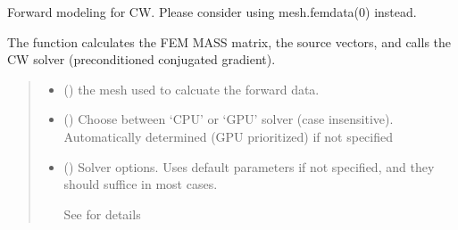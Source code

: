 \documentclass[letterpaper,10pt,english]{sphinxmanual}
\begin{document}
\begin{fulllineitems}
\label{\detokenize{_autosummary/nirfasterff.forward.femdata.femdata_stnd_CW:nirfasterff.forward.femdata.femdata_stnd_CW}}
\pysigstartsignatures
{}
\pysigstopsignatures
\sphinxAtStartPar
Forward modeling for CW. Please consider using mesh.femdata(0) instead.

\sphinxAtStartPar
The function calculates the FEM MASS matrix, the source vectors, and calls the CW solver (preconditioned conjugated gradient).
\begin{quote}\begin{description}
\begin{itemize}
\item {} 
\sphinxAtStartPar
{} () \textendash{} the mesh used to calcuate the forward data.

\item {} 
\sphinxAtStartPar
{} (\sphinxstyleliteralemphasis{\sphinxupquote{, }}) \textendash{} Choose between ‘CPU’ or ‘GPU’ solver (case insensitive). Automatically determined (GPU prioritized) if not specified

\item {} 
\sphinxAtStartPar
{} ({\hyperref[\detokenize{_autosummary/nirfasterff.utils.SolverOptions:nirfasterff.utils.SolverOptions}]{}}\sphinxstyleliteralemphasis{\sphinxupquote{, }}) \textendash{} 
\sphinxAtStartPar
Solver options. Uses default parameters if not specified, and they should suffice in most cases.

\sphinxAtStartPar
See {\hyperref[\detokenize{_autosummary/nirfasterff.utils.SolverOptions:nirfasterff.utils.SolverOptions}]{}} for details



\end{itemize}
\end{description}
\end{quote}
\end{fulllineitems}
\end{document}
